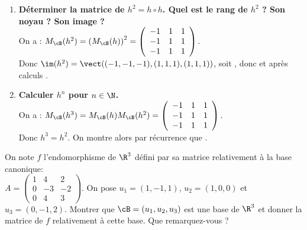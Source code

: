 \documentclass[a4paper, 11pt,reqno]{article}
\begin{document}
\begin{correction}
\begin{enumerate}
		      donc $\ker h = \{ (z, 0 , z ), z \in \R \}$, soit .\\
		      Ainsi d'apr\`es le th\'eor\`eme du rang $\rg(h) = \dim(\R^3) - \dim(\ker(h))$, soit .\\
		      Or $\im(h)= \vect( f(e_1), f(e_2) ,f(e_3)) = \vect(( -2,-1,-2),(1,1,1),(2,1,2)) = \vect((1,1,1),(2,1,2))$, donc $((1,1,1),(2,1,2))$ est une famille g\'en\'eratrice de $\im(h)$ a deux \'el\'ements, donc c'est une base de $\im(h)$.
		\item \textbf{D\'eterminer la matrice de $h^2=h\circ h$. Quel est le rang de $h^2$ ? Son noyau ? Son image ?}\\
		      On a : $ M_{\cB}(h^2) = \left(M_{\cB}(h) \right)^2 = \left(\begin{array}{rrr}
					      -1 & 1 & 1 \\
					      -1 & 1 & 1 \\
					      -1 & 1 & 1
				      \end{array} \right). $\\
		      Donc $\im(h^2) = \vect((-1,-1,-1),(1,1,1),(1,1,1))$, soit , donc  et apr\`es calculs .
		\item \textbf{Calculer $h^n$ pour $n\in\N$.}\\
		      On a : $ M_{\cB}(h^3) = M_{\cB}(h) M_{\cB}(h^2)  = \left(\begin{array}{rrr}
					      -1 & 1 & 1 \\
					      -1 & 1 & 1 \\
					      -1 & 1 & 1
				      \end{array} \right).$\\
		      Donc $h^3=h^2$. On montre alors par r\'ecurrence que .
	\end{enumerate}
\end{correction}
\begin{exercice}  \;
	On note $f$ l'endomorphisme de $\R^3$ d\'efini par sa matrice relativement \`a la base canonique: \\
	$A=\left(\begin{array}{rrr} 1&4&2\\ 0&-3&-2\\ 0&4&3 \end{array}\right)$. On pose $u_1=(1,-1,1)$, $u_2=(1,0,0)$ et $u_3=(0,-1,2)$. Montrer que $\cB=(u_1,u_2,u_3)$ est une base de $\R^3$ et donner la matrice de $f$ relativement \`a cette base. Que remarquez-vous ?
\end{exercice}
\end{document}
